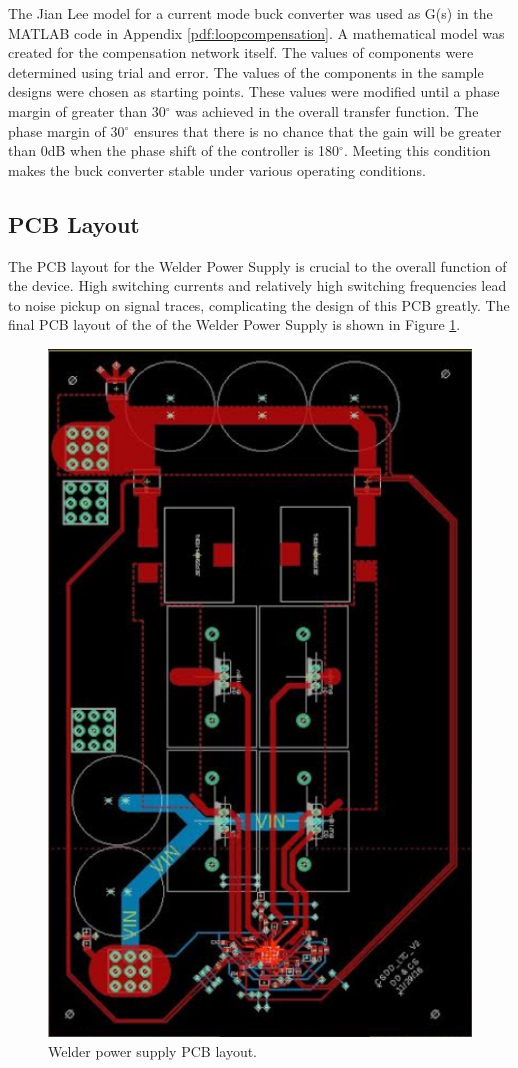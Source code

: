 \documentclass[11pt]{article}
\begin{document}
    \noident The Jian Lee model for a current mode buck converter was used as G(s) in the MATLAB code in Appendix \ref{pdf:loopcompensation}. A mathematical model was created for the compensation network itself. The values of components were determined using trial and error. The values of the components in the sample designs were chosen as starting points. These values were modified until a phase margin of greater than 30$^{\circ}$ was achieved in the overall transfer function. The phase margin of 30$^{\circ}$ ensures that there is no chance that the gain will be greater than 0dB when the phase shift of the controller is 180$^{\circ}$. Meeting this condition makes the buck converter stable under various operating conditions.
    
    \subsection{PCB Layout}
    
    \noindent The PCB layout for the Welder Power Supply is crucial to the overall function of the device. High switching currents and relatively high switching frequencies lead to noise pickup on signal traces, complicating the design of this PCB greatly. The final PCB layout of the of the Welder Power Supply is shown in Figure \ref{pcb}.
    
    \begin{figure}[H]
        \centering
        \includegraphics[width=0.3\linewidth]{pcblayout.PNG}
        \caption{Welder power supply PCB layout.}
        \label{pcb}
    \end{figure}
    
\end{document}
